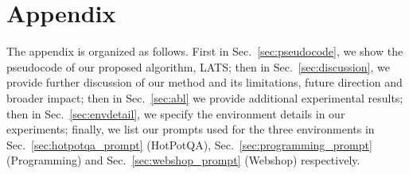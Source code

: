 \documentclass{article} \usepackage{iclr2024_conference,times}
\begin{document}



\newpage

\section{Appendix}
\appendix

The appendix is organized as follows. First in Sec.~\ref{sec:pseudocode}, we show the pseudocode of our proposed algorithm, LATS; then in Sec.~\ref{sec:discussion}, we provide further discussion of our method and its limitations, future direction and broader impact; then in Sec.~\ref{sec:abl} we provide additional experimental results; then in Sec.~\ref{sec:envdetail}, we specify the environment details in our experiments; finally, we list our prompts used for the three environments in Sec.~\ref{sec:hotpotqa_prompt} (HotPotQA), Sec.~\ref{sec:programming_prompt} (Programming) and Sec.~\ref{sec:webshop_prompt} (Webshop) respectively.
\end{document}
